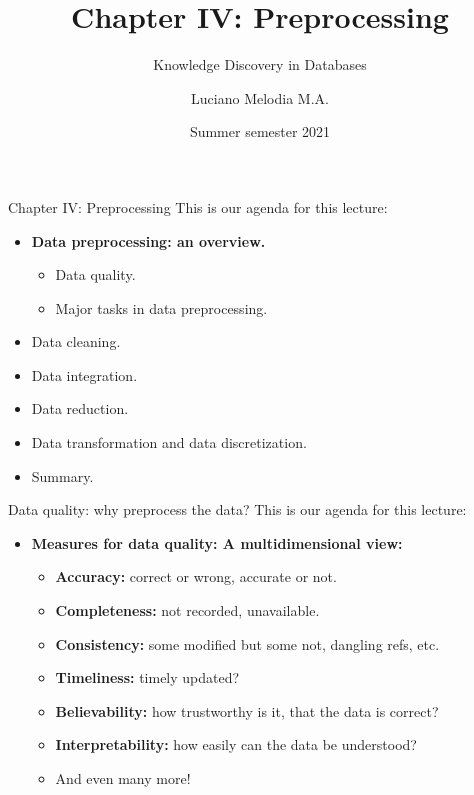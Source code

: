 \documentclass[aspectratio=169,t]{beamer}
\title[KDD]{Chapter IV: Preprocessing}
\subtitle{Knowledge Discovery in Databases}
\author[L.~Melodia]{Luciano Melodia M.A.}
\institute[Department]{Evolutionary Data Management, Friedrich-Alexander University Erlangen-Nürnberg}
\date{Summer semester 2021}
\begin{document}
  \maketitle

  { 
    \begin{frame}{Chapter IV: Preprocessing}
    This is our agenda for this lecture:
        \begin{itemize}
            \item \textbf{Data preprocessing: an overview.}
            \begin{itemize}
              \item Data quality.
              \item Major tasks in data preprocessing.
            \end{itemize}
            \item Data cleaning.
            \item Data integration.
            \item Data reduction.
            \item Data transformation and data discretization.
            \item Summary.
        \end{itemize}
    \end{frame}
  }

  { 
    \begin{frame}{Data quality: why preprocess the data?}
    This is our agenda for this lecture:
        \begin{itemize}
            \item \textbf{Measures for {\color{airforceblue}data quality}: A multidimensional view:}
            \begin{itemize}
              \item \textbf{Accuracy:} correct or wrong, accurate or not.
              \item \textbf{Completeness:} not recorded, unavailable.
              \item \textbf{Consistency:} some modified but some not, dangling refs, etc.
              \item \textbf{Timeliness:} timely updated?
              \item \textbf{Believability:} how trustworthy is it, that the data is correct?
              \item \textbf{Interpretability:} how easily can the data be understood?
              \item And even many more!
            \end{itemize}
        \end{itemize}
    \end{frame}
  }
\end{document}
